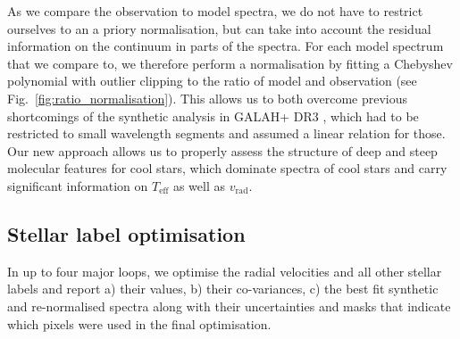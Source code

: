\documentclass[
  journal=pasa,
  manuscript=research-paper, %
  year=2023,
  volume=37
]{cup-journal}
\newcommand{\SB}[1]{{\textcolor{purple}{#1}}}
\newcommand{\Teff}{$T_\mathrm{eff}$\xspace}
\newcommand{\logg}{$\log g$\xspace}
\newcommand{\feh}{$\mathrm{[Fe/H]}$\xspace}
\newcommand{\vrad}{$v_\mathrm{rad}$\xspace}
\newcommand{\TheCannon}{\textit{The Cannon}\xspace}
\newcommand{\dex}{\,\mathrm{dex}}	%
\newcommand{\K}{\,\mathrm{K}}	%
\begin{document}
As we compare the observation to model spectra, we do not have to restrict ourselves to an a priory normalisation, but can take into account the residual information on the continuum in parts of the spectra. For each model spectrum that we compare to, we therefore perform a normalisation by fitting a Chebyshev polynomial with outlier clipping to the ratio of model and observation (see Fig.~\ref{fig:ratio_normalisation}). This allows us to both overcome previous shortcomings of the synthetic analysis in GALAH+ DR3 \citep{Buder2021}, which had to be restricted to small wavelength segments and assumed a linear relation for those. Our new approach allows us to properly assess the structure of deep and steep molecular features for cool stars, which dominate spectra of cool stars and carry significant information on \Teff as well as \vrad.


\subsection{Stellar label optimisation}
\label{sec:stellar_label_optimissation}

In up to four major loops, we optimise the radial velocities and all other stellar labels and report a) their values, b) their co-variances, c) the best fit synthetic and re-normalised spectra along with their uncertainties and masks that indicate which pixels were used in the final optimisation.
\end{document}
